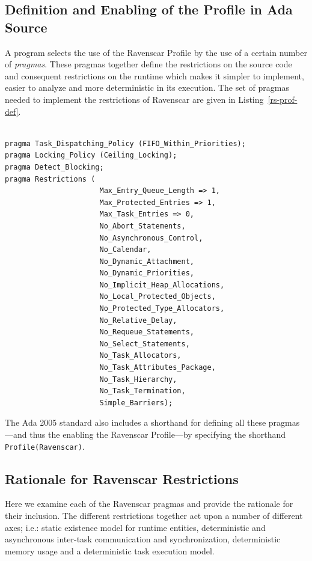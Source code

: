 \subsection{Definition and Enabling of the Profile in Ada Source}

A program selects the use of the Ravenscar Profile by the use of a
certain number of \emph{pragmas}. These pragmas together define the
restrictions on the source code and consequent restrictions on the
runtime which makes it simpler to implement, easier to analyze and
more deterministic in its execution. The set of pragmas needed to
implement the restrictions of Ravenscar are given in
Listing~\ref{rs-prof-def}.

\begin{minipage}{\listingwidth}
\begin{lstlisting}[label=rs-prof-def, caption=The Ada 95/2005 pragmas
    needed to enable the Ravenscar Profile]

pragma Task_Dispatching_Policy (FIFO_Within_Priorities);
pragma Locking_Policy (Ceiling_Locking);
pragma Detect_Blocking;
pragma Restrictions (
                      Max_Entry_Queue_Length => 1,
                      Max_Protected_Entries => 1,
                      Max_Task_Entries => 0,
                      No_Abort_Statements,
                      No_Asynchronous_Control,
                      No_Calendar,
                      No_Dynamic_Attachment,
                      No_Dynamic_Priorities,
                      No_Implicit_Heap_Allocations,
                      No_Local_Protected_Objects,
                      No_Protected_Type_Allocators,
                      No_Relative_Delay,
                      No_Requeue_Statements,
                      No_Select_Statements,
                      No_Task_Allocators,
                      No_Task_Attributes_Package,
                      No_Task_Hierarchy,
                      No_Task_Termination,
                      Simple_Barriers);
\end{lstlisting}
\end{minipage}

The Ada 2005 standard also includes a shorthand for defining all these
pragmas---and thus the enabling the Ravenscar Profile---by specifying
the shorthand  \texttt{Profile(Ravenscar)}.

\subsection{Rationale for Ravenscar Restrictions}
Here we examine each of the Ravenscar pragmas and provide the
rationale for their inclusion. The different restrictions together act
upon a number of different axes; i.e.: static existence model for
runtime entities, deterministic and asynchronous inter-task
communication and synchronization, deterministic memory usage and a
deterministic task execution model.

